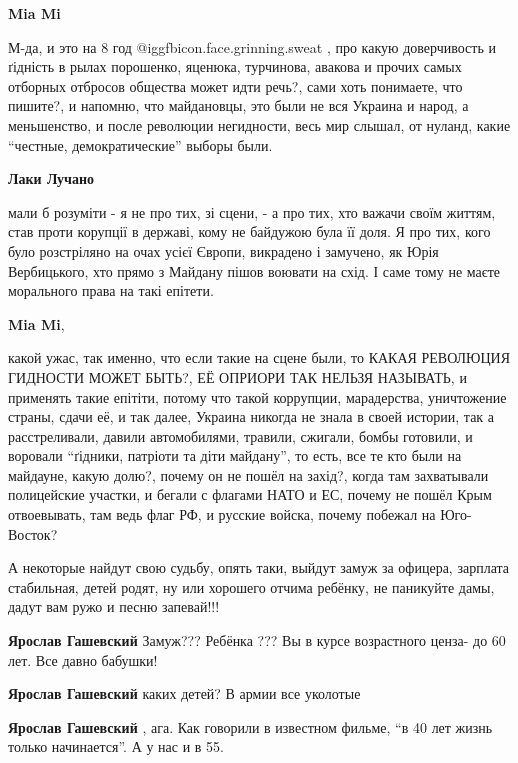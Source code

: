\begin{itemize}
\begin{itemize}
\textbf{Mia Mi} 

М-да, и это на 8 год  @igg{fbicon.face.grinning.sweat} , про какую доверчивость и ґідність в рылах порошенко,
яценюка, турчинова, авакова и прочих самых отборных отбросов общества может
идти речь?, сами хоть понимаете, что пишите?, и напомню, что майдановцы, это
были не вся Украина и народ, а меньшенство, и после революции негидности, весь
мир слышал, от нуланд, какие \enquote{честные, демократические} выборы были.

\textbf{Лаки Лучано} 

мали б розуміти - я не про тих, зі сцени, - а про тих, хто важачи своїм життям,
став проти корупції в державі, кому не байдужою була її доля. Я про тих, кого
було розстріляно на очах усієї Європи, викрадено і замучено, як Юрія
Вербицького, хто прямо з Майдану пішов воювати на схід. І саме тому не маєте
морального права на такі епітети.

\textbf{Mia Mi}, 

какой ужас, так именно, что если такие на сцене были, то КАКАЯ РЕВОЛЮЦИЯ
ГИДНОСТИ МОЖЕТ БЫТЬ?, ЕЁ ОПРИОРИ ТАК НЕЛЬЗЯ НАЗЫВАТЬ, и применять такие
епітіти, потому что такой коррупции, марадерства, уничтожение страны, сдачи её,
и так далее, Украина никогда не знала в своей истории, так а расстреливали,
давили автомобилями, травили, сжигали, бомбы готовили, и воровали  \enquote{ґідники,
патріоти та діти майдану}, то есть, все те кто были на майдауне, какую долю?,
почему он не пошёл на захід?, когда там захватывали полицейские участки, и
бегали с флагами НАТО и ЕС, почему не пошёл Крым отвоевывать, там ведь флаг РФ,
и русские войска, почему побежал на Юго-Восток?

\end{itemize} %


А некоторые найдут свою судьбу, опять таки, выйдут замуж за офицера, зарплата
стабильная, детей родят, ну или хорошего отчима ребёнку, не паникуйте дамы,
дадут вам ружо и песню запевай!!!

\begin{itemize} %
\textbf{Ярослав Гашевский} Замуж??? Ребёнка ??? Вы в курсе возрастного ценза- до 60 лет. Все давно бабушки!

\textbf{Ярослав Гашевский} каких детей? В армии все уколотые

\textbf{Ярослав Гашевский} , ага. Как говорили в известном фильме, \enquote{в 40 лет жизнь только начинается}. А у нас и в 55.
\end{itemize} %


\end{itemize}
